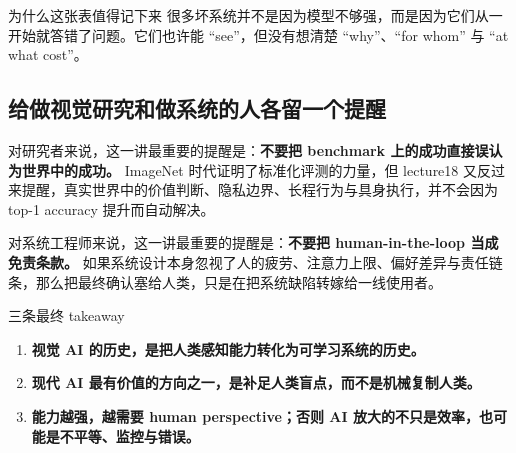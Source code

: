 \documentclass[a4paper]{article}
\begin{document}
\begin{table}[H]
\centering
\small
\renewcommand{\arraystretch}{1.18}
\caption{lecture18 的三层问题可以直接转成系统设计审查表}
\end{table}

\begin{knowledgebox}{为什么这张表值得记下来}
很多坏系统并不是因为模型不够强，而是因为它们从一开始就答错了问题。它们也许能 ``see''，但没有想清楚 ``why''、``for whom'' 与 ``at what cost''。
\end{knowledgebox}

\subsection{给做视觉研究和做系统的人各留一个提醒}

对研究者来说，这一讲最重要的提醒是：\textbf{不要把 benchmark 上的成功直接误认为世界中的成功。} ImageNet 时代证明了标准化评测的力量，但 lecture18 又反过来提醒，真实世界中的价值判断、隐私边界、长程行为与具身执行，并不会因为 top-1 accuracy 提升而自动解决。

对系统工程师来说，这一讲最重要的提醒是：\textbf{不要把 human-in-the-loop 当成免责条款。} 如果系统设计本身忽视了人的疲劳、注意力上限、偏好差异与责任链条，那么把最终确认塞给人类，只是在把系统缺陷转嫁给一线使用者。

\begin{importantbox}{三条最终 takeaway}
\begin{enumerate}
    \item \textbf{视觉 AI 的历史，是把人类感知能力转化为可学习系统的历史。}
    \item \textbf{现代 AI 最有价值的方向之一，是补足人类盲点，而不是机械复制人类。}
    \item \textbf{能力越强，越需要 human perspective；否则 AI 放大的不只是效率，也可能是不平等、监控与错误。}
\end{enumerate}
\end{importantbox}
\end{document}
